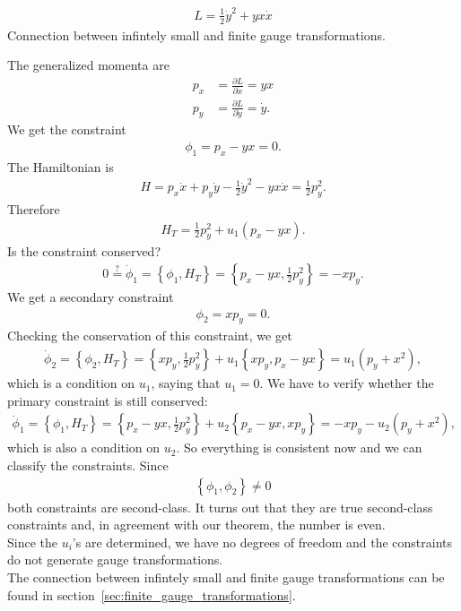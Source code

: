 \begin{exercise}
\begin{align*}
L = \frac{1}{2} \dot{y}^2 + yx\dot{x}
\end{align*}
Connection between infintely small and finite gauge transformations. 
\end{exercise}
\begin{solution}
The generalized momenta are
\begin{align*}
p_x &= \frac{\partial L}{\partial \dot{x}} = yx \\
p_y &= \frac{\partial L}{\partial \dot{y}} = \dot{y}.
\end{align*}
We get the constraint 
\begin{align*}
\phi_1 = p_x - yx = 0.
\end{align*}
The Hamiltonian is
\begin{align*}
H = p_x \dot{x} + p_y \dot{y} - \frac{1}{2} \dot{y}^2 - yx\dot{x} = \frac{1}{2} p_y^2.
\end{align*}
Therefore
\begin{align*}
H_T = \frac{1}{2} p_y^2 + u_1 (p_x - yx).
\end{align*}
Is the constraint conserved?
\begin{align*}
0 \overset{?}{=} \dot{\phi}_1 = \left \{ \phi_1,H_T \right \} = \left \{ p_x - yx,\frac{1}{2} p_y^2 \right \} = - x p_y.
\end{align*}
We get a secondary constraint
\begin{align*}
\phi_2 = x p_y = 0.
\end{align*}
Checking the conservation of this constraint, we get
\begin{align*}
\dot{\phi}_2 = \left \{ \phi_2,H_T \right \} = \left \{ x p_y,\frac{1}{2} p_y^2 \right \} + u_1 \left \{ x p_y,p_x - yx \right \} = u_1 (p_y + x^2),
\end{align*}
which is a condition on $u_1$, saying that $u_1 = 0$.
We have to verify whether the primary constraint is still conserved:
\begin{align*}
\dot{\phi}_1 = \left \{ \phi_1,H_T \right \} = \left \{ p_x - yx,\frac{1}{2} p_y^2 \right \} + u_2 \left \{ p_x - yx,x p_y \right \} = - x p_y - u_2 (p_y + x^2),
\end{align*}
which is also a condition on $u_2$.
So everything is consistent now and we can classify the constraints. Since
\begin{align*}
\left \{ \phi_1,\phi_2 \right \} \neq 0
\end{align*}
both constraints are second-class. It turns out that they are true second-class constraints and, in agreement with our theorem, the number is even. \\
Since the $u_i$'s are determined, we have no degrees of freedom and the constraints do not generate gauge transformations. \\

The connection between infintely small and finite gauge transformations can be found in section~\vref{sec:finite_gauge_transformations}.
\end{solution}



